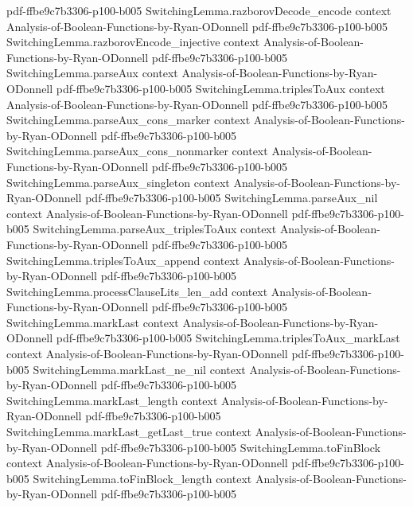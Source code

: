\begin{theorem}
  {pdf-ffbe9c7b3306-p100-b005}
\proofstep
  {SwitchingLemma.razborovDecode_encode}
  {context}
  {Analysis-of-Boolean-Functions-by-Ryan-ODonnell}
  {pdf-ffbe9c7b3306-p100-b005}
\proofstep
  {SwitchingLemma.razborovEncode_injective}
  {context}
  {Analysis-of-Boolean-Functions-by-Ryan-ODonnell}
  {pdf-ffbe9c7b3306-p100-b005}
\proofstep
  {SwitchingLemma.parseAux}
  {context}
  {Analysis-of-Boolean-Functions-by-Ryan-ODonnell}
  {pdf-ffbe9c7b3306-p100-b005}
\proofstep
  {SwitchingLemma.triplesToAux}
  {context}
  {Analysis-of-Boolean-Functions-by-Ryan-ODonnell}
  {pdf-ffbe9c7b3306-p100-b005}
\proofstep
  {SwitchingLemma.parseAux_cons_marker}
  {context}
  {Analysis-of-Boolean-Functions-by-Ryan-ODonnell}
  {pdf-ffbe9c7b3306-p100-b005}
\proofstep
  {SwitchingLemma.parseAux_cons_nonmarker}
  {context}
  {Analysis-of-Boolean-Functions-by-Ryan-ODonnell}
  {pdf-ffbe9c7b3306-p100-b005}
\proofstep
  {SwitchingLemma.parseAux_singleton}
  {context}
  {Analysis-of-Boolean-Functions-by-Ryan-ODonnell}
  {pdf-ffbe9c7b3306-p100-b005}
\proofstep
  {SwitchingLemma.parseAux_nil}
  {context}
  {Analysis-of-Boolean-Functions-by-Ryan-ODonnell}
  {pdf-ffbe9c7b3306-p100-b005}
\proofstep
  {SwitchingLemma.parseAux_triplesToAux}
  {context}
  {Analysis-of-Boolean-Functions-by-Ryan-ODonnell}
  {pdf-ffbe9c7b3306-p100-b005}
\proofstep
  {SwitchingLemma.triplesToAux_append}
  {context}
  {Analysis-of-Boolean-Functions-by-Ryan-ODonnell}
  {pdf-ffbe9c7b3306-p100-b005}
\proofstep
  {SwitchingLemma.processClauseLits_len_add}
  {context}
  {Analysis-of-Boolean-Functions-by-Ryan-ODonnell}
  {pdf-ffbe9c7b3306-p100-b005}
\proofstep
  {SwitchingLemma.markLast}
  {context}
  {Analysis-of-Boolean-Functions-by-Ryan-ODonnell}
  {pdf-ffbe9c7b3306-p100-b005}
\proofstep
  {SwitchingLemma.triplesToAux_markLast}
  {context}
  {Analysis-of-Boolean-Functions-by-Ryan-ODonnell}
  {pdf-ffbe9c7b3306-p100-b005}
\proofstep
  {SwitchingLemma.markLast_ne_nil}
  {context}
  {Analysis-of-Boolean-Functions-by-Ryan-ODonnell}
  {pdf-ffbe9c7b3306-p100-b005}
\proofstep
  {SwitchingLemma.markLast_length}
  {context}
  {Analysis-of-Boolean-Functions-by-Ryan-ODonnell}
  {pdf-ffbe9c7b3306-p100-b005}
\proofstep
  {SwitchingLemma.markLast_getLast_true}
  {context}
  {Analysis-of-Boolean-Functions-by-Ryan-ODonnell}
  {pdf-ffbe9c7b3306-p100-b005}
\proofstep
  {SwitchingLemma.toFinBlock}
  {context}
  {Analysis-of-Boolean-Functions-by-Ryan-ODonnell}
  {pdf-ffbe9c7b3306-p100-b005}
\proofstep
  {SwitchingLemma.toFinBlock_length}
  {context}
  {Analysis-of-Boolean-Functions-by-Ryan-ODonnell}
  {pdf-ffbe9c7b3306-p100-b005}
\proofstep

\end{theorem}
